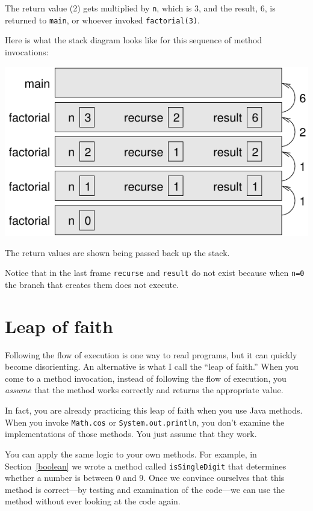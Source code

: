 \noindent The return value (2) gets multiplied by {\tt n}, which is 3,
and the result, 6, is returned to {\tt main}, or whoever
invoked {\tt factorial(3)}.


Here is what the stack diagram looks like for this sequence of
method invocations:

\includegraphics{figs/stack3.pdf}

The return values are shown being passed back up the stack.

Notice that in the last frame {\tt recurse} and {\tt result} do not
exist because when {\tt n=0} the branch that creates them does not
execute.


\section{Leap of faith}
\label{leap of faith}

Following the flow of execution is one way to read programs, but it can
quickly become disorienting.  An alternative is what I call the ``leap
of faith.''  When you come to a method invocation, instead of
following the flow of execution, you {\em assume} that the method
works correctly and returns the appropriate value.

In fact, you are already practicing this leap of faith
when you use Java methods.  When you invoke {\tt Math.cos}
or {\tt System.out.println}, you don't examine the implementations of
those methods.  You just assume that they work.

You can apply the same logic to your own methods.
For example, in Section~\ref{boolean} we wrote a method called
{\tt isSingleDigit} that determines whether a number is between
0 and 9.  Once we convince ourselves that this method
is correct---by testing and examination of the code---we can
use the method without ever looking at the code again.


